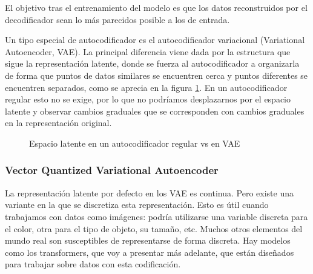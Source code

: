 El objetivo tras el entrenamiento del modelo es que los datos reconstruidos por el decodificador sean lo más parecidos posible a los de entrada.

Un tipo especial de autocodificador es el autocodificador variacional (Variational Autoencoder, VAE). La principal diferencia viene dada por la estructura que sigue la representación latente, donde se fuerza al autocodificador a organizarla de forma que puntos de datos similares se encuentren cerca y puntos diferentes se encuentren separados, como se aprecia en la figura \ref{fig:vae}. En un autocodificador regular esto no se exige, por lo que no podríamos desplazarnos por el espacio latente y observar cambios graduales que se corresponden con cambios graduales en la representación original. \cite{vqvae}

\begin{figure}[H]
\centering
    \caption{Espacio latente en un autocodificador regular vs en VAE \cite{vqvae}}
    \label{fig:vae}
\end{figure}

\subsubsection{Vector Quantized Variational Autoencoder}
La representación latente por defecto en los VAE es continua. Pero existe una variante en la que se discretiza esta representación. Esto es útil cuando trabajamos con datos como imágenes: podría utilizarse una variable discreta para el color, otra para el tipo de objeto, su tamaño, etc. Muchos otros elementos del mundo real son susceptibles de representarse de forma discreta. Hay modelos como los transformers, que voy a presentar más adelante, que están diseñados para trabajar sobre datos con esta codificación. \cite{vqvae}

